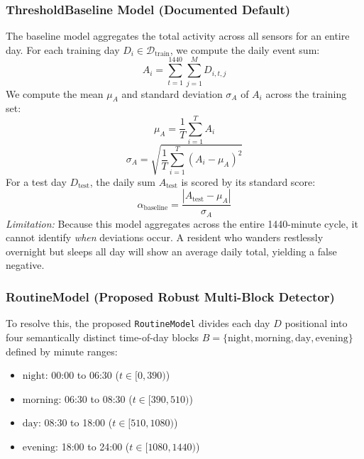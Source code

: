 \documentclass[conference]{IEEEtran}
\begin{document}
\subsubsection{ThresholdBaseline Model (Documented Default)}
The baseline model aggregates the total activity across all sensors for an entire day. For each training day $D_i \in \mathcal{D}_{\text{train}}$, we compute the daily event sum:
\begin{equation}
A_i = \sum_{t=1}^{1440} \sum_{j=1}^{M} D_{i, t, j}
\end{equation}
We compute the mean $\mu_A$ and standard deviation $\sigma_A$ of $A_i$ across the training set:
\begin{equation}
\mu_A = \frac{1}{T} \sum_{i=1}^{T} A_i
\end{equation}
\begin{equation}
\sigma_A = \sqrt{\frac{1}{T} \sum_{i=1}^{T} (A_i - \mu_A)^2}
\end{equation}
For a test day $D_{\text{test}}$, the daily sum $A_{\text{test}}$ is scored by its standard score:
\begin{equation}
\alpha_{\text{baseline}} = \frac{|A_{\text{test}} - \mu_A|}{\sigma_A}
\end{equation}
\textit{Limitation:} Because this model aggregates across the entire 1440-minute cycle, it cannot identify \textit{when} deviations occur. A resident who wanders restlessly overnight but sleeps all day will show an average daily total, yielding a false negative.

\subsubsection{RoutineModel (Proposed Robust Multi-Block Detector)}
To resolve this, the proposed \texttt{RoutineModel} divides each day $D$ positional into four semantically distinct time-of-day blocks $B = \{\text{night}, \text{morning}, \text{day}, \text{evening}\}$ defined by minute ranges:
\begin{itemize}
  \item $\text{night}$: 00:00 to 06:30 ($t \in [0, 390)$)
  \item $\text{morning}$: 06:30 to 08:30 ($t \in [390, 510)$)
  \item $\text{day}$: 08:30 to 18:00 ($t \in [510, 1080)$)
  \item $\text{evening}$: 18:00 to 24:00 ($t \in [1080, 1440)$)
\end{itemize}
\end{document}
